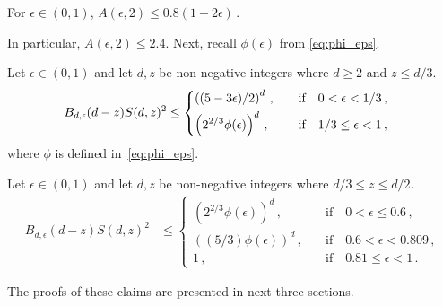 \begin{claim}\label{claim:multiple-honest-blocks}
  For $\epsilon \in (0, 1)$, 
  $
    A(\epsilon, 2) 
    \leq 0.8 (1 + 2 \epsilon)
    \,.
  $
\end{claim}
\noindent
In particular, $A(\epsilon, 2) \leq 2.4$. Next, recall $\phi(\epsilon)$ from  \eqref{eq:phi_eps}.

\begin{claim}\label{claim:t1star-variance-exact}
  Let $\epsilon \in (0,1)$ and 
  let $d,z$ be non-negative integers where $d \geq 2$ and $z \leq d/3$. 
  \begin{align*}
    B_{d, \epsilon}(d-z) S(d,z)^2
    &\leq \begin{dcases} 
    \left( (5-3 \epsilon)/2 \right)^d \,,
        &\quad \text{if}\quad
        0 < \epsilon < 1/3 \,, \\
    \left( 2^{2/3} \phi(\epsilon) \right)^d \,,
        &\quad \text{if}\quad
        1/3 \leq \epsilon < 1 \, ,
    \end{dcases}
  \end{align*}
  where $\phi$ is defined in~\eqref{eq:phi_eps}.
\end{claim}

\begin{claim}\label{claim:t2star-variance-exact}
  Let $\epsilon \in (0,1)$ and 
  let $d,z$ be non-negative integers where $d/3 \leq z \leq d/2$. 
  \begin{align*}
    B_{d, \epsilon}(d-z) S(d,z)^2
    &\leq \begin{cases} 
    \left( 2^{2/3} \phi(\epsilon) \right)^d \,,
        &\quad\text{if}\quad 0 < \epsilon \leq 0.6\,, \\
    \left( (5/3) \phi(\epsilon)  \right)^d \,,
        &\quad\text{if}\quad 0.6 < \epsilon < 0.809\,, \\
    1 \,,
        &\quad\text{if}\quad 0.81 \leq \epsilon < 1
        \,.
    \end{cases}
  \end{align*}
\end{claim}



The proofs of these claims are presented in next three sections.





